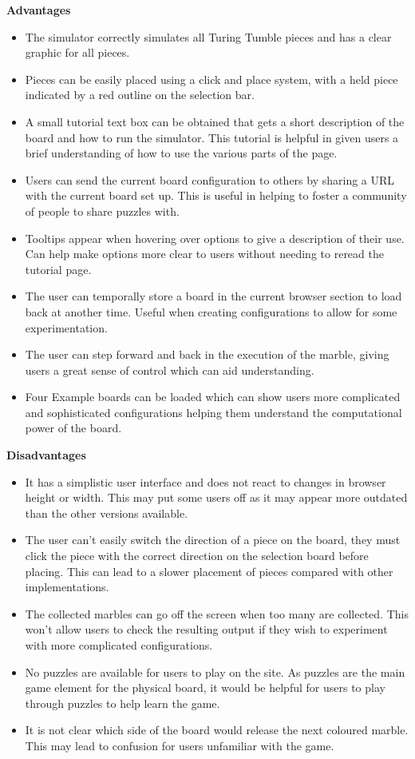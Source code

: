 \documentclass{l4proj}
\begin{document}
\textbf{Advantages}
\begin{itemize}
    \item The simulator correctly simulates all Turing Tumble pieces and has a clear graphic for all pieces.
    \item Pieces can be easily placed using a click and place system, with a held piece indicated by a red outline on the selection bar.
    \item A small tutorial text box can be obtained that gets a short description of the board and how to run the simulator. This tutorial is helpful in given users a brief understanding of how to use the various parts of the page.
    \item Users can send the current board configuration to others by sharing a URL with the current board set up. This is useful in helping to foster a community of people to share puzzles with.
    \item Tooltips appear when hovering over options to give a description of their use. Can help make options more clear to users without needing to reread the tutorial page.
    \item The user can temporally store a board in the current browser section to load back at another time. Useful when creating configurations to allow for some experimentation.
    \item The user can step forward and back in the execution of the marble, giving users a great sense of control which can aid understanding.
    \item Four Example boards can be loaded which can show users more complicated and sophisticated configurations helping them understand the computational power of the board.
\end{itemize}

\textbf{Disadvantages}
\begin{itemize}
    \item It has a simplistic user interface and does not react to changes in browser height or width. This may put some users off as it may appear more outdated than the other versions available.
    \item The user can't easily switch the direction of a piece on the board, they must click the piece with the correct direction on the selection board before placing. This can lead to a slower placement of pieces compared with other implementations.
    \item The collected marbles can go off the screen when too many are collected. This won't allow users to check the resulting output if they wish to experiment with more complicated configurations.
    \item No puzzles are available for users to play on the site. As puzzles are the main game element for the physical board, it would be helpful for users to play through puzzles to help learn the game.
    \item It is not clear which side of the board would release the next coloured marble. This may lead to confusion for users unfamiliar with the game.
\end{itemize}
\end{document}
